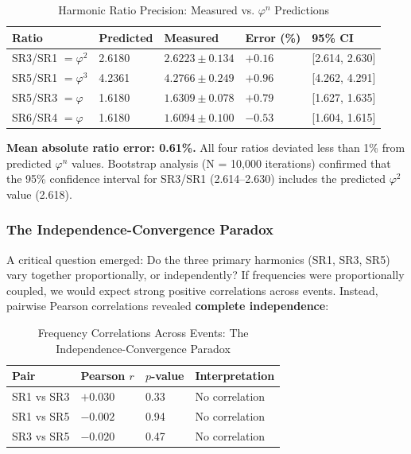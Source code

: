 \documentclass[11pt,a4paper]{article}
\newcommand{\phisym}{\varphi}
\begin{document}
\begin{table}[H]
\centering
\caption{Harmonic Ratio Precision: Measured vs. $\phisym^n$ Predictions}
\label{tab:ratio_precision}
\begin{tabular}{lllll}
\toprule
Ratio & Predicted & Measured & Error (\%) & 95\% CI \\
\midrule
SR3/SR1 $= \varphi^2$ & 2.6180 & $2.6223 \pm 0.134$ & $+0.16$ & [2.614, 2.630] \\
SR5/SR1 $= \varphi^3$ & 4.2361 & $4.2766 \pm 0.249$ & $+0.96$ & [4.262, 4.291] \\
SR5/SR3 $= \varphi$ & 1.6180 & $1.6309 \pm 0.078$ & $+0.79$ & [1.627, 1.635] \\
SR6/SR4 $= \varphi$ & 1.6180 & $1.6094 \pm 0.100$ & $-0.53$ & [1.604, 1.615] \\
\bottomrule
\end{tabular}
\end{table}

\textbf{Mean absolute ratio error: 0.61\%.} All four ratios deviated less than 1\% from predicted $\phisym^n$ values. Bootstrap analysis (N = 10,000 iterations) confirmed that the 95\% confidence interval for SR3/SR1 (2.614--2.630) includes the predicted $\phisym^2$ value (2.618).

\subsubsection{The Independence-Convergence Paradox}
A critical question emerged: Do the three primary harmonics (SR1, SR3, SR5) vary together proportionally, or independently? If frequencies were proportionally coupled, we would expect strong positive correlations across events. Instead, pairwise Pearson correlations revealed \textbf{complete independence}:

\begin{table}[H]
\centering
\caption{Frequency Correlations Across Events: The Independence-Convergence Paradox}
\label{tab:independence}
\begin{tabular}{llll}
\toprule
Pair & Pearson $r$ & $p$-value & Interpretation \\
\midrule
SR1 vs SR3 & $+0.030$ & 0.33 & No correlation \\
SR1 vs SR5 & $-0.002$ & 0.94 & No correlation \\
SR3 vs SR5 & $-0.020$ & 0.47 & No correlation \\
\bottomrule
\end{tabular}
\end{table}
\end{document}
